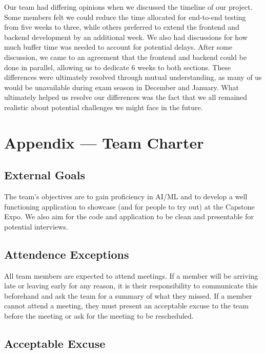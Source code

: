 \documentclass{article}
\begin{document}
\begin {enumerate}
Our team had differing opinions when we discussed the timeline of our project. Some members felt we could reduce the time allocated for end-to-end testing from five weeks to three, while others preferred to extend the frontend and backend development by an additional week. We also had discussions for how much buffer time was needed to account for potential delays. After some discussion, we came to an agreement that the frontend and backend could be done in parallel, allowing us to dedicate 6 weeks to both sections. These differences were ultimately resolved through mutual understanding, as many of us would be unavailable during exam season in December and January. What ultimately helped us resolve our differences was the fact that we all remained realistic about potential challenges we might face in the future.

\end{enumerate}

\section{Appendix --- Team Charter}

\subsection{External Goals}

The team's objectives are to gain proficiency in AI/ML and to develop a well functioning application to showcase (and for people to try out) at the Capstone Expo. We also aim for the code and application to be clean and presentable for potential interviews.

\subsection{Attendence Exceptions}

All team members are expected to attend meetings. If a member will be arriving late or leaving early for any reason, it is their responsibility to communicate this beforehand and ask the team for a summary of what they missed. If a member cannot attend a meeting, they must present an acceptable excuse to the team before the meeting or ask for the meeting to be rescheduled.

\subsection{Acceptable Excuse}
\end{document}
